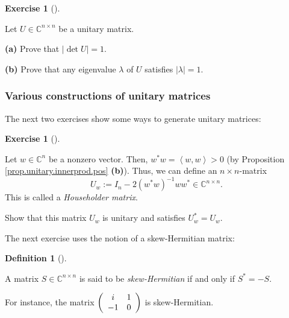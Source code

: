 \documentclass[numbers=enddot,12pt,final,onecolumn,notitlepage]{scrartcl}%
\newcounter{exer}
\numberwithin{exer}{subsection}
\theoremstyle{definition}
\newtheorem{defi}[theo]{Definition}
\newenvironment{definition}[1][]
{\begin{defi}[#1]\begin{leftbar}}
{\end{leftbar}\end{defi}}
\newtheorem{exmp}[exer]{Exercise}
\newenvironment{exercise}[1][]
{\begin{exmp}[#1]\begin{leftbar}}
{\end{leftbar}\end{exmp}}
\begin{document}
\begin{exercise}
\label{exe.unitary.det-eval} Let $U\in\mathbb{C}^{n\times n}$ be a
unitary matrix. \medskip

\textbf{(a)} Prove that $\left\vert \det U\right\vert =1$. \medskip

\textbf{(b)} Prove that any eigenvalue $\lambda$ of $U$ satisfies $\left\vert
\lambda\right\vert =1$.
\end{exercise}

\subsubsection{Various constructions of unitary matrices}

The next two exercises show some ways to generate unitary matrices:

\begin{exercise}
\label{exe.unitary.house} Let $w\in\mathbb{C}^{n}$ be a nonzero
vector. Then, $w^{\ast}w=\left\langle w,w\right\rangle >0$ (by Proposition
\ref{prop.unitary.innerprod.pos} \textbf{(b)}). Thus, we can define an
$n\times n$-matrix
\[
U_{w}:=I_{n}-2\left(  w^{\ast}w\right)  ^{-1}ww^{\ast}\in\mathbb{C}^{n\times
n}.
\]
This is called a \emph{Householder matrix}.

Show that this matrix $U_{w}$ is unitary and satisfies $U_{w}^{\ast}=U_{w}$.
\end{exercise}

The next exercise uses the notion of a skew-Hermitian matrix:

\begin{definition}
\label{def.unitary.skew-herm}A matrix $S\in\mathbb{C}^{n\times n}$ is said to
be \emph{skew-Hermitian} if and only if $S^{\ast}=-S$.
\end{definition}

For instance, the matrix $\left(
\begin{array}
[c]{cc}%
i & 1\\
-1 & 0
\end{array}
\right)  $ is skew-Hermitian.
\end{document}
